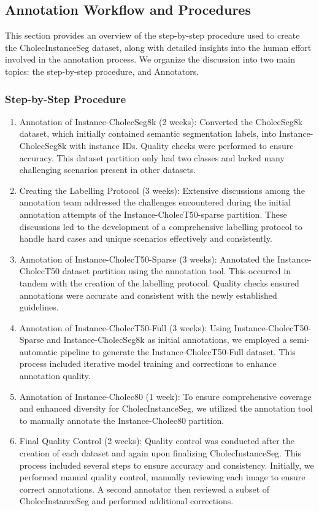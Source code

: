 \subsection*{Annotation Workflow and Procedures}
This section provides an overview of the step-by-step procedure used to create the CholecInstanceSeg dataset, along with detailed insights into the human effort involved in the annotation process. We organize the discussion into two main topics: the step-by-step procedure, and Annotators.

\subsubsection*{Step-by-Step Procedure}

\begin{enumerate}
    \item Annotation of Instance-CholecSeg8k (2 weeks): Converted the CholecSeg8k dataset, which initially contained semantic segmentation labels, into Instance-CholecSeg8k with instance IDs. Quality checks were performed to ensure accuracy. This dataset partition only had two classes and lacked many challenging scenarios present in other datasets.
    \item Creating the Labelling Protocol (3 weeks): Extensive discussions among the annotation team addressed the challenges encountered during the initial annotation attempts of the Instance-CholecT50-sparse partition. These discussions led to the development of a comprehensive labelling protocol to handle hard cases and unique scenarios effectively and consistently.
    \item Annotation of Instance-CholecT50-Sparse (3 weeks): Annotated the Instance-CholecT50 dataset partition using the annotation tool. This occurred in tandem with the creation of the labelling protocol. Quality checks ensured annotations were accurate and consistent with the newly established guidelines.
    \item Annotation of Instance-CholecT50-Full (3 weeks): Using Instance-CholecT50-Sparse and Instance-CholecSeg8k as initial annotations, we employed a semi-automatic pipeline to generate the Instance-CholecT50-Full dataset. This process included iterative model training and corrections to enhance annotation quality.
    \item Annotation of Instance-Cholec80 (1 week): To ensure comprehensive coverage and enhanced diversity for CholecInstanceSeg, we utilized the annotation tool to manually annotate the Instance-Cholec80 partition.
    \item Final Quality Control (2 weeks): Quality control was conducted after the creation of each dataset and again upon finalizing CholecInstanceSeg. This process included several steps to ensure accuracy and consistency. Initially, we performed manual quality control, manually reviewing each image to ensure correct annotations. A second annotator then reviewed a subset of CholecInstanceSeg and performed additional corrections.


\end{enumerate}

